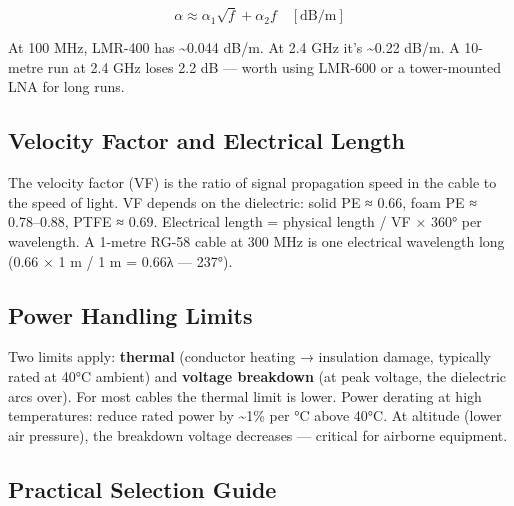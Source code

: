 
      
\[\alpha \approx \alpha_1\sqrt{f} + \alpha_2 f \quad [\text{dB/m}]\]

      

At 100 MHz, LMR-400 has \textasciitilde{}0.044 dB/m. At 2.4 GHz it's \textasciitilde{}0.22 dB/m. A 10-metre run at 2.4 GHz loses 2.2 dB — worth using LMR-600 or a tower-mounted LNA for long runs.

      

\subsection{Velocity Factor and Electrical Length}

      

The velocity factor (VF) is the ratio of signal propagation speed in the cable to the speed of light. VF depends on the dielectric: solid PE ≈ 0.66, foam PE ≈ 0.78–0.88, PTFE ≈ 0.69. Electrical length = physical length / VF × 360° per wavelength. A 1-metre RG-58 cable at 300 MHz is one electrical wavelength long (0.66 × 1 m / 1 m = 0.66λ — 237°).

      

\subsection{Power Handling Limits}

      

Two limits apply: \textbf{thermal} (conductor heating → insulation damage, typically rated at 40°C ambient) and \textbf{voltage breakdown} (at peak voltage, the dielectric arcs over). For most cables the thermal limit is lower. Power derating at high temperatures: reduce rated power by \textasciitilde{}1\% per °C above 40°C. At altitude (lower air pressure), the breakdown voltage decreases — critical for airborne equipment.

      

\subsection{Practical Selection Guide}

